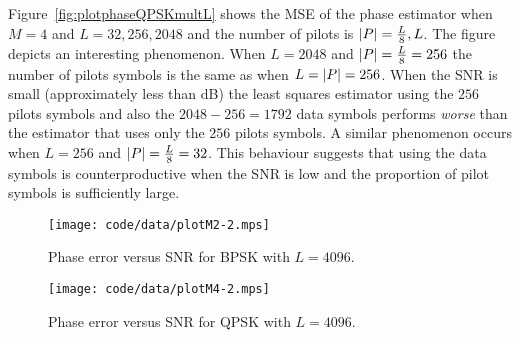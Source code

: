 \documentclass[journal]{IEEEtran}
\begin{document}
Figure~\ref{fig:plotphaseQPSKmultL} shows the MSE of the phase estimator when $M=4$ and $L=32,256, 2048$ and the number of pilots is ${\left\vert P \right\vert}=\tfrac{L}{8},L$.  The figure depicts an interesting phenomenon.  When $L=2048$ and ${\left\vert P \right\vert} = \tfrac{L}{8} = 256$ the number of pilots symbols is the same as when $L={\left\vert P \right\vert} = 256$.  When the SNR is small (approximately less than \unit[0]{dB}) the least squares estimator using the $256$ pilots symbols and also the $2048-256=1792$ data symbols performs \emph{worse} than the estimator that uses only the $256$ pilots symbols.  A similar phenomenon occurs when $L=256$ and ${\left\vert P \right\vert} = \tfrac{L}{8} = 32$.  This behaviour suggests that using the data symbols is counterproductive when the SNR is low and the proportion of pilot symbols is sufficiently large.


\begin{figure}[p]
	\centering
		\texttt{[image: code/data/plotM2-2.mps]}
		\caption{Phase error versus SNR for BPSK with $L=4096$.}
		\label{fig:plotphaseBPSK}
\end{figure}

\begin{figure}[p]
	\centering
		\texttt{[image: code/data/plotM4-2.mps]}
		\caption{Phase error versus SNR for QPSK with $L=4096$.}
		\label{fig:plotphaseQPSK}
\end{figure}
\end{document}
